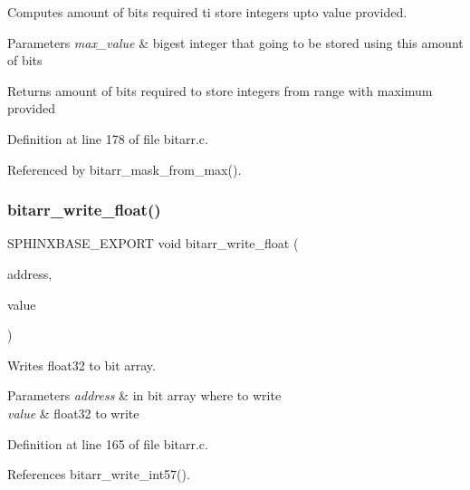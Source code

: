 Computes amount of bits required ti store integers upto value provided. 


\begin{DoxyParams}{Parameters}
{\em max\+\_\+value} & bigest integer that going to be stored using this amount of bits \\
\hline
\end{DoxyParams}
\begin{DoxyReturn}{Returns}
amount of bits required to store integers from range with maximum provided 
\end{DoxyReturn}


Definition at line 178 of file bitarr.\+c.



Referenced by bitarr\+\_\+mask\+\_\+from\+\_\+max().

\mbox{\label{bitarr_8h_a5bfde61176ff84b0aa17377545780c06}} 
\subsubsection{bitarr\+\_\+write\+\_\+float()}
{\footnotesize\ttfamily S\+P\+H\+I\+N\+X\+B\+A\+S\+E\+\_\+\+E\+X\+P\+O\+RT void bitarr\+\_\+write\+\_\+float (\begin{DoxyParamCaption}\item[{\textbf{ bitarr\+\_\+address\+\_\+t}}]{address,  }\item[{float}]{value }\end{DoxyParamCaption})}



Writes float32 to bit array. 


\begin{DoxyParams}{Parameters}
{\em address} & in bit array where to write \\
\hline
{\em value} & float32 to write \\
\hline
\end{DoxyParams}


Definition at line 165 of file bitarr.\+c.



References bitarr\+\_\+write\+\_\+int57().

\mbox{\label{bitarr_8h_ac3d0d63f49bbbca64fe5cc20bef0d2f8}} 
